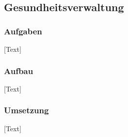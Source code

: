 
\subsection{Gesundheitsverwaltung}

\subsubsection{Aufgaben}
[Text]

\subsubsection{Aufbau}
[Text]

\subsubsection{Umsetzung}
[Text]



